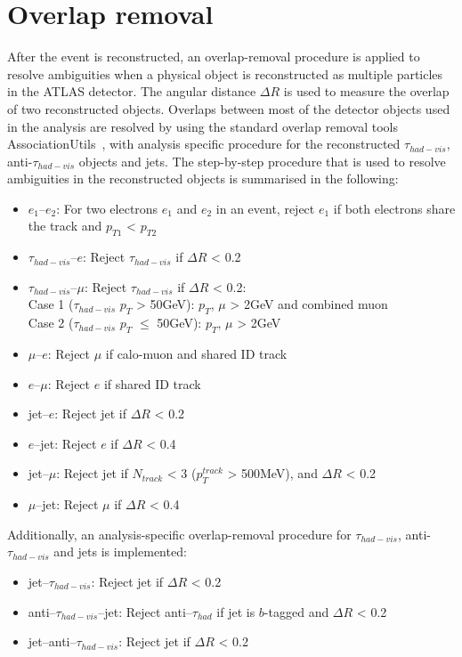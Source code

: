 \section{Overlap removal}
After the event is reconstructed, an overlap-removal procedure is applied 
to resolve ambiguities when a physical object is reconstructed as multiple 
particles in the \hbox{ATLAS} detector. The angular distance $\Delta R$ is used 
to measure the overlap of two reconstructed objects.
Overlaps between most of the detector objects used in the analysis are resolved 
by using the standard overlap removal tools AssociationUtils~\cite{ORTool}, 
with analysis specific procedure for 
the reconstructed $\tau_{had-vis}$, anti-$\tau_{had-vis}$ objects and jets.
The step-by-step procedure that is used to resolve ambiguities in the 
reconstructed objects is summarised in  the following:
 \begin{itemize}
     \item  $e_1$--$e_2$: For two electrons $e_1$ and $e_2$ in an event,  
     reject $e_1$ if both electrons share the track and $p_{T1}$ < $p_{T2}$
    \item  $\tau_{had-vis}$--$e$: Reject $\tau_{had-vis}$ if $\Delta R$ < 0.2 
    \item  $\tau_{had-vis}$--$\mu$: Reject $\tau_{had-vis}$ if $\Delta R$ < 0.2:
     \\ Case 1 ($\tau_{had-vis}$ $p_T$ > 50GeV): $p_T$, $\mu$ > 2GeV and combined muon
     \\ Case 2 ($\tau_{had-vis}$ $p_T$ $\leq$ 50GeV): $p_T$, $\mu$ > 2GeV
    \item  $\mu$--$e$: Reject $\mu$ if calo-muon and shared ID track
    \item  $e$--$\mu$: Reject $e$ if shared ID track
    \item  jet--$e$: Reject jet if $\Delta R$ < 0.2
    \item  $e$--jet: Reject $e$ if $\Delta R$ < 0.4
    \item  jet--$\mu$: Reject jet if $N_{track}$ < 3 ($p_{T}^{track}$ > 500MeV), and $\Delta R$ < 0.2
    \item  $\mu$--jet: Reject $\mu$ if $\Delta R$ < 0.4
 \end{itemize}
 Additionally, an analysis-specific overlap-removal procedure for $\tau_{had-vis}$, 
 anti-$\tau_{had-vis}$ and jets is implemented:
\begin{itemize}
    \item jet--$\tau_{had-vis}$: Reject jet if $\Delta R$ < 0.2
    \item anti--$\tau_{had-vis}$--jet: Reject anti--$\tau_{had}$ if jet is $b$-tagged and $\Delta R$ < 0.2
    \item jet--anti--$\tau_{had-vis}$: Reject jet if $\Delta R$ < 0.2
\end{itemize}

